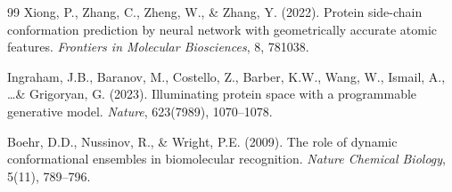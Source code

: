 \documentclass[11pt,a4paper]{article}
\begin{document}
\begin{thebibliography}{99}
Xiong, P., Zhang, C., Zheng, W., \& Zhang, Y. (2022).
Protein side-chain conformation prediction by neural network with geometrically accurate atomic features.
\textit{Frontiers in Molecular Biosciences}, 8, 781038.

Ingraham, J.B., Baranov, M., Costello, Z., Barber, K.W., Wang, W., Ismail, A., \ldots \& Grigoryan, G. (2023).
Illuminating protein space with a programmable generative model.
\textit{Nature}, 623(7989), 1070--1078.

Boehr, D.D., Nussinov, R., \& Wright, P.E. (2009).
The role of dynamic conformational ensembles in biomolecular recognition.
\textit{Nature Chemical Biology}, 5(11), 789--796.

\end{thebibliography}
\end{document}

